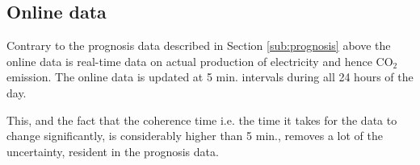\documentclass[Main]{subfiles}
\begin{document}

	\subsection{Online data} %
	\label{sub:online_data}
		Contrary to the prognosis data described in Section \ref{sub:prognosis} above the online data is real-time data on actual production of electricity and hence CO$_2$ emission.
		The online data is updated at 5 min. intervals during all 24 hours of the day.

		This, and the fact that the coherence time i.e. the time it takes for the data to change significantly, is considerably higher than 5 min., removes a lot of the uncertainty, resident in the prognosis data.


\end{document}
